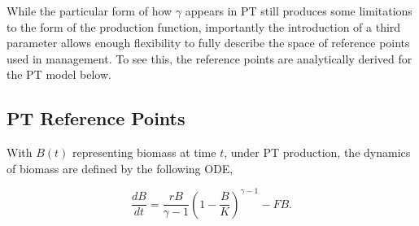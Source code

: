 \documentclass[12pt]{article}
\begin{document}
{%


%
\clearpage

%
While the particular form of how $\gamma$ appears in PT still produces some 
limitations to the form of the production function, importantly the 
introduction of a third parameter allows enough flexibility to fully describe 
the space of reference points used in management. To see this, the reference 
points are analytically derived for the PT model below. %



%
\subsection{PT Reference Points}\label{ptRef}

%
With $B(t)$ representing biomass at time $t$, under PT production, the 
dynamics of biomass are defined by the following ODE,
 
\begin{equation}
\frac{dB}{dt} = \frac{r B}{\gamma-1} \left(1-\frac{B}{K}\right)^{\gamma-1} - FB. \label{odePT}
\end{equation}

}
\end{document}
